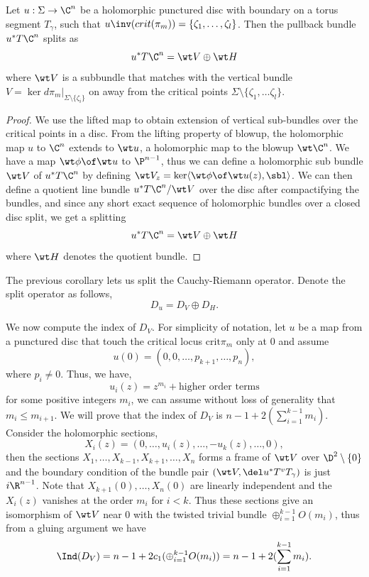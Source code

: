 \begin{cor}
Let $u:\Sigma \to \C^n$ be a holomorphic punctured disc with boundary on a torus segment $T_\gamma$, such that $u\inv(crit(\pi_m))=\{\zeta_1,\dots,\zeta_l\}$. Then the pullback bundle $u^*T\C^n$ splits as 
\begin{equation*}
    u^*T\C^n  = \wt V \oplus \wt H
\end{equation*}
where $\wt V$ is a subbundle that matches with the vertical bundle $ V = \ker d\pi_m\big|_{\Sigma\setminus \{\zeta_i\}}$ on away from the critical points $\Sigma\setminus \{\zeta_1, \dots \zeta_l\}  $.
\end{cor}
\begin{proof}

We use the lifted map to obtain extension of vertical sub-bundles over the critical points in a disc.  From the lifting property of blowup, the holomorphic map $u$ to $\C^n$ extends to $\wt u$, a holomorphic map to the blowup $\wt \C^n$. We have a map $\wt \phi \of \wt u$ to $\P^{n-1}$, thus we can define a holomorphic sub bundle $\wt V$ of $u^*T\C^n$ by defining $\wt V_z = \ker \langle \wt \phi \of \wt u (z),\sbl \rangle $. We can then define a quotient line bundle $u^*T\C^n/\wt V$ over the disc after compactifying the bundles, and since any short exact sequence of holomorphic bundles over a closed disc split, we get a splitting $$ u^*T\C^n = \wt V \oplus \wt H$$ where $\wt H$ denotes the quotient bundle. 


\end{proof}

The previous corollary lets us split the Cauchy-Riemann operator. Denote the split operator as follows, $$D_u= D_V \oplus D_H.$$

\noindent We now compute the index of $D_V$. For simplicity of notation, let $u$ be a map from a punctured disc that touch the critical locus $\text{crit}\pi_m$ only at $0$ and assume  $$u(0) = (0,0,\dots,p_{k+1},\dots,p_n),$$where $p_i \neq 0 $. Thus, we have, $$u_i(z)=z^{m_i} + \text{higher order terms}$$ for some positive integers $m_i$, we can assume without loss of generality that $m_i\leq m_{i+1}$. We will prove that the index of $D_V$ is $n-1+ 2(\sum_{i=1}^{k-1} m_i)$. Consider the holomorphic sections, $$X_i(z) = (0,\dots,u_i(z),\dots,-u_k(z),\dots,0),$$ then the sections $X_1,\dots, X_{k-1},X_{k+1},\dots,X_n$ forms a frame of $\wt V$ over $\D^2\setminus\{0\}$ and the boundary condition of the bundle pair $(\wt V,\del u^* T^v T_\gamma)$ is just $i\R^{n-1}$. Note that $X_{k+1}(0),\dots,X_{n}(0)$ are linearly independent and the $X_i(z)$ vanishes at the order $m_i$ for $i<k$. Thus these sections give an isomorphism of $\wt V$ near $0$ with the twisted trivial bundle $\oplus_{i=1}^{k-1} O(m_i)$, thus from a gluing argument we have $$\Ind(D_V) = n-1 + 2c_1(\oplus_{i=1}^{k-1} O(m_i)) =n-1 + 2(\sum_{i=1}^{k-1} m_i). $$

